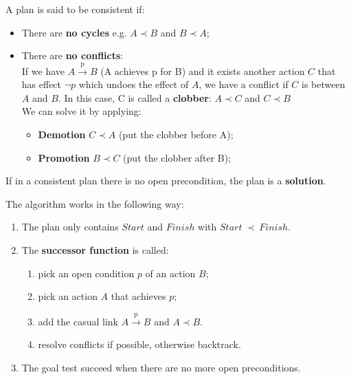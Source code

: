 \documentclass{article}
\begin{document}
A plan is said to be consistent if:

\begin{itemize}
    \item There are \textbf{no cycles}  e.g. $A \prec B$ and $B \prec A$;
    \item There are \textbf{no conflicts}: \\
        If we have $A \xrightarrow{\text{p}} B$ (A achieves p for B) and it exists another action $C$ that has effect $\neg p$ which undoes the effect of $A$, we have a conflict if $C$ is between $A$ and $B$. In this case, C is called a \textbf{clobber}: $A \prec C$ and $C \prec B$\\
        We can solve it by applying:
        \begin{itemize}[label=$\bullet$]
            \item \textbf{Demotion} $C \prec A$ (put the clobber before A);
            \item \textbf{Promotion} $B \prec C$ (put the clobber after B);
        \end{itemize}
\end{itemize}

\begin{flushleft}
    If in a consistent plan there is no open precondition, the plan is a \textbf{solution}.    
\end{flushleft}

\newpage

The algorithm works in the following way:

\begin{enumerate}
    \item The plan only contains $Start$ and $Finish$ with $Start\ \prec\ Finish$.
    \item The \textbf{successor function} is called:
    \begin{enumerate}
        \item pick an open condition $p$ of an action $B$;
        \item pick an action $A$ that achieves $p$;
        \item add the casual link $A \xrightarrow{\text{p}} B$ and $A \prec B$.
        \item resolve conflicts if possible, otherwise backtrack.
    \end{enumerate}
    \item The goal test succeed when there are no more open preconditions.
\end{enumerate}
\end{document}
